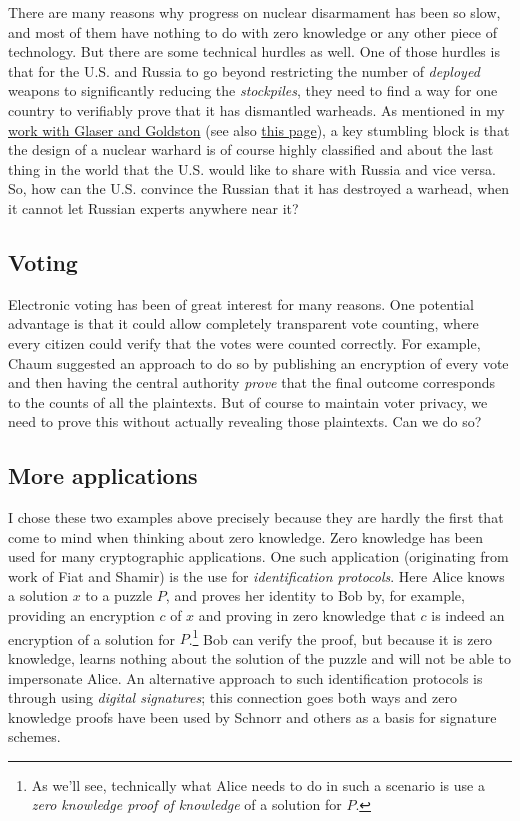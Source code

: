 There are many reasons why progress on nuclear disarmament has been so
slow, and most of them have nothing to do with zero knowledge or any
other piece of technology. But there are some technical hurdles as well.
One of those hurdles is that for the U.S. and Russia to go beyond
restricting the number of \emph{deployed} weapons to significantly
reducing the \emph{stockpiles}, they need to find a way for one country
to verifiably prove that it has dismantled warheads. As mentioned in my
\href{http://www.nature.com/nature/journal/v510/n7506/full/nature13457.html}{work
with Glaser and Goldston} (see also
\href{http://nuclearfutures.princeton.edu/warhead-verification/}{this
page}), a key stumbling block is that the design of a nuclear warhard is
of course highly classified and about the last thing in the world that
the U.S. would like to share with Russia and vice versa. So, how can the
U.S. convince the Russian that it has destroyed a warhead, when it
cannot let Russian experts anywhere near it?

\subsection{Voting}\label{13-Voting}

Electronic voting has been of great interest for many reasons. One
potential advantage is that it could allow completely transparent vote
counting, where every citizen could verify that the votes were counted
correctly. For example, Chaum suggested an approach to do so by
publishing an encryption of every vote and then having the central
authority \emph{prove} that the final outcome corresponds to the counts
of all the plaintexts. But of course to maintain voter privacy, we need
to prove this without actually revealing those plaintexts. Can we do so?

\subsection{More applications}\label{13-More-applications}

I chose these two examples above precisely because they are hardly the
first that come to mind when thinking about zero knowledge. Zero
knowledge has been used for many cryptographic applications. One such
application (originating from work of Fiat and Shamir) is the use for
\emph{identification protocols}. Here Alice knows a solution \(x\) to a
puzzle \(P\), and proves her identity to Bob by, for example, providing
an encryption \(c\) of \(x\) and proving in zero knowledge that \(c\) is
indeed an encryption of a solution for \(P\).\footnote{As we'll see,
  technically what Alice needs to do in such a scenario is use a
  \emph{zero knowledge proof of knowledge} of a solution for \(P\).} Bob
can verify the proof, but because it is zero knowledge, learns nothing
about the solution of the puzzle and will not be able to impersonate
Alice. An alternative approach to such identification protocols is
through using \emph{digital signatures}; this connection goes both ways
and zero knowledge proofs have been used by Schnorr and others as a
basis for signature schemes.


